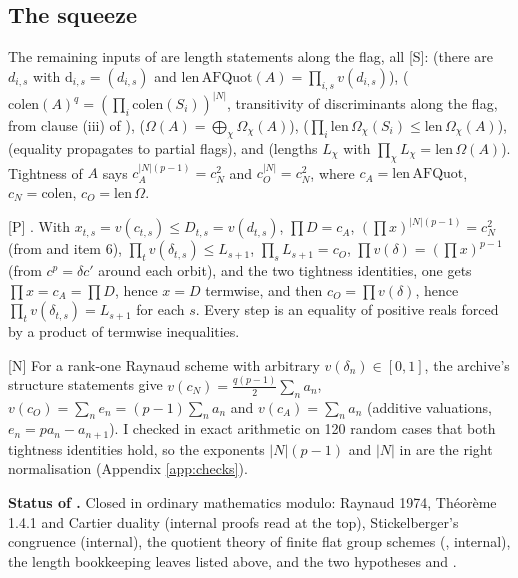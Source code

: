 \documentclass[11pt]{article}
\newcommand{\mP}{\textsf{[P]}}
\newcommand{\mS}{\textsf{[S]}}
\newcommand{\mN}{\textsf{[N]}}
\theoremstyle{remark}
\begin{document}
\subsection{The squeeze}
The remaining inputs of  are length statements along the flag, all \mS:
 (there are $d_{i,s}$ with $\mathrm{d}_{i,s}=(d_{i,s})$ and $\mathrm{len}\,\mathrm{AFQuot}(A)=\prod_{i,s}v(d_{i,s})$),
 ($\mathrm{colen}(A)^{q}=(\prod_i\mathrm{colen}(S_i))^{|N|}$, transitivity of discriminants along the flag, from clause (iii) of ),
 ($\Omega(A)=\bigoplus_\chi\Omega_\chi(A)$),
 ($\prod_i\mathrm{len}\,\Omega_\chi(S_i)\le\mathrm{len}\,\Omega_\chi(A)$),
 (equality propagates to partial flags), and
 (lengths $L_\chi$ with $\prod_\chi L_\chi=\mathrm{len}\,\Omega(A)$).
Tightness of $A$ says $c_A^{|N|(p-1)}=c_N^2$ and $c_O^{|N|}=c_N^2$, where $c_A=\mathrm{len}\,\mathrm{AFQuot}$, $c_N=\mathrm{colen}$, $c_O=\mathrm{len}\,\Omega$.

\mP{} . With $x_{t,s}=v(c_{t,s})\le D_{t,s}=v(d_{t,s})$, $\prod D=c_A$, $(\prod x)^{|N|(p-1)}=c_N^2$ (from  and item 6), $\prod_t v(\delta_{t,s})\le L_{s+1}$, $\prod_sL_{s+1}=c_O$, $\prod v(\delta)=(\prod x)^{p-1}$ (from $c^p=\delta c'$ around each orbit), and the two tightness identities, one gets $\prod x=c_A=\prod D$, hence $x=D$ termwise, and then $c_O=\prod v(\delta)$, hence $\prod_tv(\delta_{t,s})=L_{s+1}$ for each $s$. Every step is an equality of positive reals forced by a product of termwise inequalities.

\mN{} For a rank-one Raynaud scheme with arbitrary $v(\delta_n)\in[0,1]$, the archive's structure statements give $v(c_N)=\tfrac{q(p-1)}2\sum_na_n$, $v(c_O)=\sum_n e_n=(p-1)\sum_na_n$ and $v(c_A)=\sum_na_n$ (additive valuations, $e_n=pa_n-a_{n+1}$). I checked in exact arithmetic on 120 random cases that both tightness identities hold, so the exponents $|N|(p-1)$ and $|N|$ in  are the right normalisation (Appendix \ref{app:checks}).

\textbf{Status of .} Closed in ordinary mathematics modulo: Raynaud 1974, Th\'eor\`eme 1.4.1 and Cartier duality (internal proofs read at the top), Stickelberger's congruence (internal), the quotient theory of finite flat group schemes (, internal), the length bookkeeping leaves listed above, and the two hypotheses  and .
\end{document}
